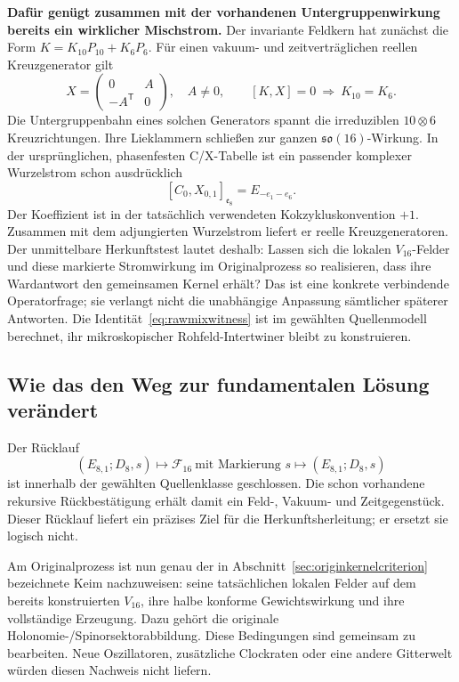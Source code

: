 \textbf{Dafür genügt zusammen mit der vorhandenen Untergruppenwirkung bereits ein wirklicher Mischstrom.} Der invariante Feldkern hat zunächst die Form $K=K_{10}P_{10}+K_6P_6$. Für einen vakuum- und zeitverträglichen reellen Kreuzgenerator gilt
\begin{equation}
X=\begin{pmatrix}0&A\\-A^{\mathsf T}&0\end{pmatrix},\quad A\ne0,
\qquad [K,X]=0\ \Longrightarrow\ K_{10}=K_6.
\end{equation}
Die Untergruppenbahn eines solchen Generators spannt die irreduziblen $10\otimes6$ Kreuzrichtungen. Ihre Lieklammern schließen zur ganzen $\mathfrak{so}(16)$-Wirkung. In der ursprünglichen, phasenfesten C/X-Tabelle ist ein passender komplexer Wurzelstrom schon ausdrücklich
\begin{equation}\label{eq:rawmixwitness}
\boxed{[C_0,X_{0,1}]_{\mathfrak e_8}=E_{-e_1-e_6}.}
\end{equation}
Der Koeffizient ist in der tatsächlich verwendeten Kokzykluskonvention $+1$. Zusammen mit dem adjungierten Wurzelstrom liefert er reelle Kreuzgeneratoren. Der unmittelbare Herkunftstest lautet deshalb: Lassen sich die lokalen $V_{16}$-Felder und diese markierte Stromwirkung im Originalprozess so realisieren, dass ihre Wardantwort den gemeinsamen Kernel erhält? Das ist eine konkrete verbindende Operatorfrage; sie verlangt nicht die unabhängige Anpassung sämtlicher späterer Antworten. Die Identität~\eqref{eq:rawmixwitness} ist im gewählten Quellenmodell berechnet, ihr mikroskopischer Rohfeld-Intertwiner bleibt zu konstruieren.

\subsection{Wie das den Weg zur fundamentalen Lösung verändert}
Der Rücklauf
\begin{equation}
(E_{8,1};D_8,s)\longmapsto\mathcal F_{16}\ \text{mit Markierung }s
\longmapsto(E_{8,1};D_8,s)
\end{equation}
ist innerhalb der gewählten Quellenklasse geschlossen. Die schon vorhandene rekursive Rückbestätigung erhält damit ein Feld-, Vakuum- und Zeitgegenstück. Dieser Rücklauf liefert ein präzises Ziel für die Herkunftsherleitung; er ersetzt sie logisch nicht.

Am Originalprozess ist nun genau der in Abschnitt~\ref{sec:originkernelcriterion} bezeichnete Keim nachzuweisen: seine tatsächlichen lokalen Felder auf dem bereits konstruierten $V_{16}$, ihre halbe konforme Gewichtswirkung und ihre vollständige Erzeugung. Dazu gehört die originale Holonomie-/Spinorsektorabbildung. Diese Bedingungen sind gemeinsam zu bearbeiten. Neue Oszillatoren, zusätzliche Clockraten oder eine andere Gitterwelt würden diesen Nachweis nicht liefern.

